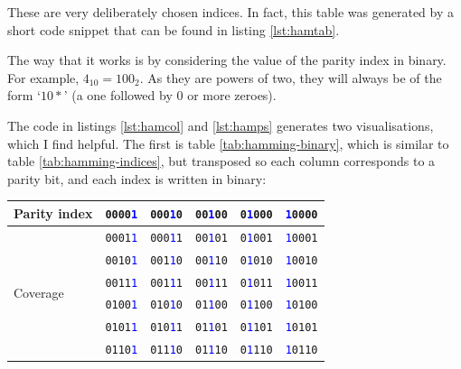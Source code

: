 \documentclass[a4paper,11pt]{article}
\begin{document}
    These are very deliberately chosen indices. In fact, this table was
    generated by a short code snippet that can be found in listing
    \ref{lst:hamtab}.

    The way that it works is by considering the value of the parity index in
    binary. For example, $4_{10}=100_{2}$. As they are powers of two, they will
    always be of the form `$10*$' (a one followed by 0 or more zeroes).

    The code in listings \ref{lst:hamcol} and \ref{lst:hamps} generates two
    visualisations, which I find helpful. The first is table
    \ref{tab:hamming-binary}, which is similar to table
    \ref{tab:hamming-indices}, but transposed so each column corresponds to a
    parity bit, and each index is written in binary:

\begin{table}[H]
\begin{center}
    \begin{tabular}{l|rrrrr}
    \toprule
    Parity index & \texttt{0000\textcolor{blue}{1}} & \texttt{000\textcolor{blue}{1}0} & \texttt{00\textcolor{blue}{1}00} & \texttt{0\textcolor{blue}{1}000} & \texttt{\textcolor{blue}{1}0000} \\
    \midrule
    \multirow{14}{*}{Coverage}
    & \texttt{0001\textcolor{blue}{1}} & \texttt{000\textcolor{blue}{1}1} & \texttt{00\textcolor{blue}{1}01} & \texttt{0\textcolor{blue}{1}001} & \texttt{\textcolor{blue}{1}0001} \\
    & \texttt{0010\textcolor{blue}{1}} & \texttt{001\textcolor{blue}{1}0} & \texttt{00\textcolor{blue}{1}10} & \texttt{0\textcolor{blue}{1}010} & \texttt{\textcolor{blue}{1}0010} \\
    & \texttt{0011\textcolor{blue}{1}} & \texttt{001\textcolor{blue}{1}1} & \texttt{00\textcolor{blue}{1}11} & \texttt{0\textcolor{blue}{1}011} & \texttt{\textcolor{blue}{1}0011} \\
    & \texttt{0100\textcolor{blue}{1}} & \texttt{010\textcolor{blue}{1}0} & \texttt{01\textcolor{blue}{1}00} & \texttt{0\textcolor{blue}{1}100} & \texttt{\textcolor{blue}{1}0100} \\
    & \texttt{0101\textcolor{blue}{1}} & \texttt{010\textcolor{blue}{1}1} & \texttt{01\textcolor{blue}{1}01} & \texttt{0\textcolor{blue}{1}101} & \texttt{\textcolor{blue}{1}0101} \\
    & \texttt{0110\textcolor{blue}{1}} & \texttt{011\textcolor{blue}{1}0} & \texttt{01\textcolor{blue}{1}10} & \texttt{0\textcolor{blue}{1}110} & \texttt{\textcolor{blue}{1}0110} \\

\end{tabular}
\end{center}
\end{table}
\end{document}
